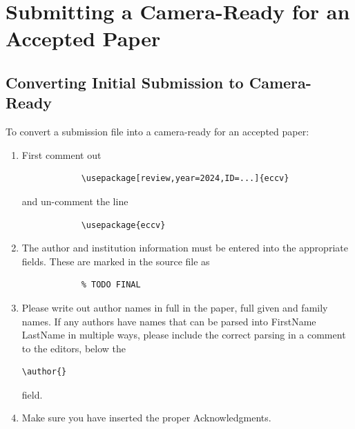 \documentclass[runningheads]{llncs}
\begin{document}
\section{Submitting a Camera-Ready for an Accepted Paper}
\subsection{Converting Initial Submission to Camera-Ready}
To convert a submission file into a camera-ready for an accepted paper:
\begin{enumerate}
    \item First comment out 
          \begin{verbatim}
            \usepackage[review,year=2024,ID=...]{eccv}
          \end{verbatim} and un-comment the line
          \begin{verbatim}
            \usepackage{eccv}
          \end{verbatim}
    \item The author and institution information must be entered into the appropriate fields.
          These are marked in the source file as
          \begin{verbatim}
            % TODO FINAL
          \end{verbatim}
    \item Please write out author names in full in the paper, \ie full given and family names. 
          If any authors have names that can be parsed into FirstName LastName in multiple ways, please include the correct parsing in a comment to the editors, below the \begin{verbatim}\author{}\end{verbatim} field.
    \item Make sure you have inserted the proper Acknowledgments.
  \end{enumerate}  
 
\end{document}
